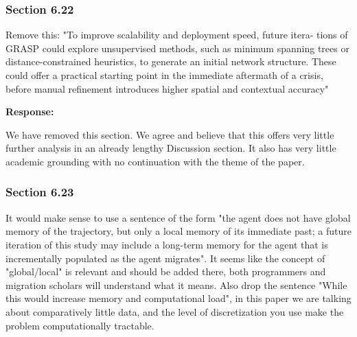 \documentclass[11pt,a4paper]{article}
\begin{document}
\vspace{0.5cm}

\subsubsection*{Section 6.22}

\begin{reviewbox}
Remove this: "To improve scalability and deployment speed, future itera-
tions of GRASP could explore unsupervised methods, such as minimum spanning trees or distance-constrained
heuristics, to generate an initial network structure. These could offer a practical starting point in the immediate
aftermath of a crisis, before manual refinement introduces higher spatial and contextual accuracy"
\end{reviewbox}

\textbf{Response:}

We have removed this section. We agree and believe that this offers very little further analysis in an already 
lengthy Discussion section. It also has very little academic grounding with no continuation with the theme of the
 paper.

\vspace{0.5cm}

\begin{updatebox}

\end{updatebox}

\vspace{0.5cm}

\subsubsection*{Section 6.23}

\begin{reviewbox}
It would make sense to use a sentence of the form "the agent does not have global memory of the trajectory, but only a local memory of its immediate past; a future iteration of this study may include a long-term memory for the agent that is incrementally populated as the agent migrates". It seems like the concept of "global/local" is relevant and should be added there, both programmers and migration scholars will understand what it means.
Also drop the sentence "While this would increase memory and computational load", in this paper we are talking about comparatively little data, and the level of discretization you use make the problem computationally tractable.
\end{reviewbox}
\end{document}
